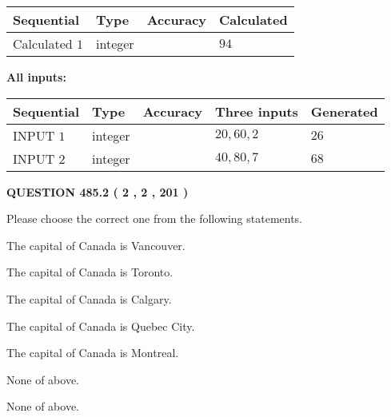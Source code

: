 \documentclass[12pt]{article}
\begin{document}
   
  
  
\noindent\begin{tabular}{|l|l|l|l|}
\hline
 Sequential & Type & Accuracy & Calculated \\ 
\hline
 
 
  Calculated $  1 $ & integer &  & 
  $ 94 $ 
 \\  \hline  
 \end{tabular}
   
   
   
   
\noindent\vspace{0.1in}\hspace{-0.08in} {\textbf{\Large{All inputs: }}}
   
   
  
  
\noindent\begin{tabular}{|l|l|l|l|l|}
\hline
 Sequential & Type & Accuracy & Three inputs & Generated \\ 
\hline
 
 
  INPUT $  1 $ & integer &  & $
 20
 , 
 60
 , 
 2
 $ & $ 26 $ 
 \\  \hline  
 
 
  INPUT $  2 $ & integer &  & $
 40
 , 
 80
 , 
 7
 $ & $ 68 $ 
 \\  \hline  
 \end{tabular}
   
   
  
\vspace{0.2in}
  
{\textbf{\Large{QUESTION
485.2 
 ( 2 , 2 , 201 )
}}}
  
  
Please choose the correct one from the following statements.
 
 
The capital of Canada is Vancouver.
 
 
The capital of Canada is Toronto.
 
 
The capital of Canada is Calgary.
 
 
The capital of Canada is Quebec City.
 
 
The capital of Canada is Montreal.
 
 
 None of above.
 
 
\noindent{}
 
 
 None of above.
 
\end{document}
